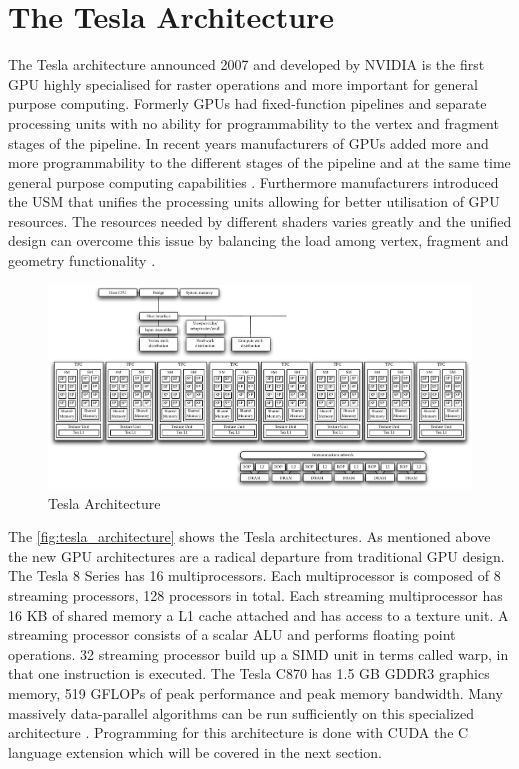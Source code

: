 \section{The Tesla Architecture}%
\label{sub:the_tesla_architecture} 
The Tesla architecture announced 2007 and developed by \gls{NVIDIA} is the first
\gls{GPU} highly specialised for raster operations and more important
for general purpose computing. Formerly \glspl{GPU} had fixed-function
pipelines and separate processing units with no ability for programmability to
the vertex and fragment stages of the pipeline. In recent years manufacturers of
\glspl{GPU} added more and more programmability to the different stages
of the pipeline and at the same time general purpose computing capabilities
\citep{citeulike:3844545}. Furthermore manufacturers introduced the  \gls{USM} 
that unifies the processing units allowing for better
utilisation of  \gls{GPU} resources. The resources needed by different
shaders varies greatly and the unified design can overcome this issue by
balancing the load among vertex, fragment and geometry functionality
\citep{citeulike:3145468}.

\begin{figure}[ht]
\centering
\includegraphics[width=\textwidth]{gfx/tesla_architecture} 
\caption{Tesla Architecture} 
\label{fig:tesla_architecture} 
\end{figure} 

The \autoref{fig:tesla_architecture} shows the Tesla architectures. As mentioned
above the new \gls{GPU} architectures are a radical departure from traditional
\gls{GPU} design. The Tesla 8 Series has 16 multiprocessors. Each multiprocessor
is composed of 8 streaming processors, 128 processors in total. Each streaming
multiprocessor has 16 \gls{KB} of shared memory a L1 cache attached and has access
to a texture unit. A streaming processor consists of a scalar \gls{ALU} and
performs floating point operations. 32 streaming processor build up a \gls{SIMD}
unit in {} terms called warp, in that one instruction is executed. The Tesla
C870 has 1.5 \gls{GB} \gls{GDDR3} graphics memory, 519 \glspl{GFLOP} of peak
performance and  peak memory bandwidth. Many massively
data-parallel algorithms can be run sufficiently on this specialized
architecture \citep{citeulike:3145468}. Programming for this architecture is
done with \gls{CUDA} the C language extension which will be covered in the next
section.


